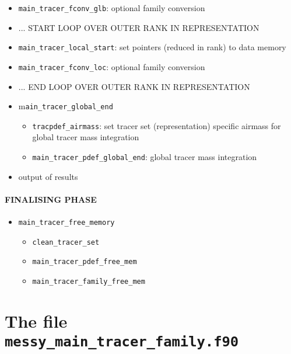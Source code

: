 \documentclass[twoside]{article}
\begin{document}
\begin{itemize}
   \item {\tt main\_tracer\_fconv\_glb}: optional family conversion

   \item {... START LOOP OVER OUTER RANK IN REPRESENTATION}

   \item {\tt main\_tracer\_local\_start}:
         set pointers (reduced in rank) to data memory

   \item {\tt  main\_tracer\_fconv\_loc}: optional family conversion

   \item {... END LOOP OVER OUTER RANK IN REPRESENTATION}

   \item m{\tt ain\_tracer\_global\_end}
        \begin{itemize}
         \item {\tt tracpdef\_airmass}:
               set tracer set (representation) specific
               airmass for
               global tracer mass integration
         \item {\tt  main\_tracer\_pdef\_global\_end}:
               global tracer mass integration
        \end{itemize} 

   \item output of results
\end{itemize}

\paragraph{FINALISING PHASE}
\begin{itemize}

   \item {\tt main\_tracer\_free\_memory}
        \begin{itemize}
          \item {\tt clean\_tracer\_set}
          \item {\tt main\_tracer\_pdef\_free\_mem}
          \item {\tt main\_tracer\_family\_free\_mem}
        \end{itemize} 

\end{itemize}

\section{The file {\tt messy\_main\_tracer\_family.f90}}
\label{sec:family}
\end{document}
